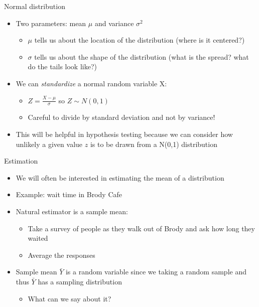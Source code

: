 \documentclass[aspectratio=169]{beamer}
\begin{document}
\begin{frame}{Normal distribution}
    \begin{itemize}
        \item Two parameters: mean $\mu$ and variance $\sigma^2$
        \begin{itemize}
            \item $\mu$ tells us about the location of the distribution (where is it centered?)
            \item $\sigma$ tells us about the shape of the distribution (what is the spread? what do the tails look like?)
        \end{itemize}
        \item We can \textit{standardize} a normal random variable X:
        \begin{itemize}
            \item $Z = \frac{X-\mu}{\sigma}$ so $Z \sim N(0,1)$
            \item Careful to divide by standard deviation and not by variance!
        \end{itemize}
        \item This will be helpful in hypothesis testing because we can consider how unlikely a given value $z$ is to be drawn from a N(0,1) distribution
    \end{itemize}
\end{frame}

\begin{frame}{Estimation}
    \begin{itemize}
        \item We will often be interested in estimating the mean of a distribution
        \item Example: wait time in Brody Cafe
        \item Natural estimator is a sample mean:
        \begin{itemize}
            \item Take a survey of people as they walk out of Brody and ask how long they waited
            \item Average the responses
        \end{itemize}
        \item Sample mean $\bar{Y}$ is a random variable since we taking a random sample and thus $\bar{Y}$ has a sampling distribution
        \begin{itemize}
            \item What can we say about it?
        \end{itemize}
    \end{itemize}
\end{frame}
\end{document}
